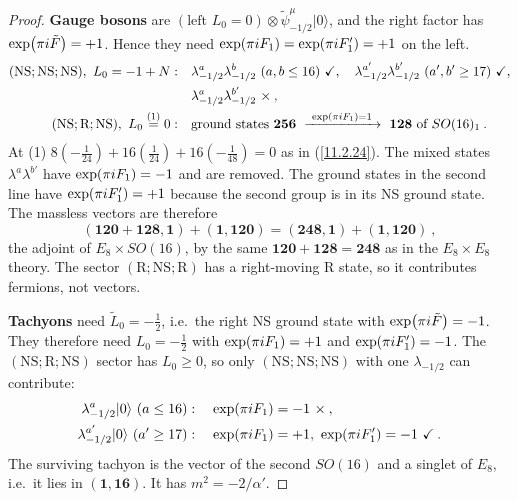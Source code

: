 \begin{tcolorbox}[breakable]
\begin{proof}
		\textbf{Gauge bosons} are $(\text{left }L_{0}=0)\otimes\tilde{\psi}^{\mu}_{-1/2}\lvert0\rangle$, and the right factor has $\exp(\pi i\tilde{F})=+1$. Hence they need $\exp(\pi i F_{1})=\exp(\pi i F_{1}')=+1$ on the left.
		\begin{align*}
			(\text{NS};\text{NS};\text{NS}),\ L_{0}=-1+N:&\quad \lambda^{a}_{-1/2}\lambda^{b}_{-1/2}\ (a,b\leq16)\ \checkmark,\quad
			\lambda^{a'}_{-1/2}\lambda^{b'}_{-1/2}\ (a',b'\geq17)\ \checkmark,\\
			&\quad \lambda^{a}_{-1/2}\lambda^{b'}_{-1/2}\ \times\:,\\
			(\text{NS};\text{R};\text{NS}),\ L_{0}\eqs{1}0:&\quad \text{ground states }\mathbf{256}\ \xrightarrow{\ \exp(\pi\mi F_{1})=1\ }\ \mathbf{128}\ \text{of }SO(16)_{1}\:.
		\end{align*}
		At (1) $8(-\frac{1}{24})+16(\frac{1}{24})+16(-\frac{1}{48})=0$ as in (\ref{11.2.24}). The mixed states $\lambda^{a}\lambda^{b'}$ have $\exp(\pi i F_{1})=-1$ and are removed. The ground states in the second line have $\exp(\pi i F_{1}')=+1$ because the second group is in its NS ground state. The massless vectors are therefore
		\begin{equation*}
			(\mathbf{120}+\mathbf{128},\mathbf{1})+(\mathbf{1},\mathbf{120})=(\mathbf{248},\mathbf{1})+(\mathbf{1},\mathbf{120})\:,
		\end{equation*}
		the adjoint of $E_{8}\times SO(16)$, by the same $\mathbf{120}+\mathbf{128}=\mathbf{248}$ as in the $E_{8}\times E_{8}$ theory. The sector $(\text{R};\text{NS};\text{R})$ has a right-moving R state, so it contributes fermions, not vectors.

		\textbf{Tachyons} need $\tilde{L}_{0}=-\frac{1}{2}$, i.e.\ the right NS ground state with $\exp(\pi i\tilde{F})=-1$. They therefore need $L_{0}=-\frac{1}{2}$ with $\exp(\pi i F_{1})=+1$ and $\exp(\pi i F_{1}')=-1$. The $(\text{NS};\text{R};\text{NS})$ sector has $L_{0}\geq0$, so only $(\text{NS};\text{NS};\text{NS})$ with one $\lambda_{-1/2}$ can contribute:
		\begin{align*}
			\lambda^{a}_{-1/2}\lvert0\rangle\ (a\leq16)&:\quad \exp(\pi i F_{1})=-1\ \times\:,\\
			\lambda^{a'}_{-1/2}\lvert0\rangle\ (a'\geq17)&:\quad \exp(\pi i F_{1})=+1,\ \exp(\pi i F_{1}')=-1\ \checkmark\:.
		\end{align*}
		The surviving tachyon is the vector of the second $SO(16)$ and a singlet of $E_{8}$, i.e.\ it lies in $(\mathbf{1},\mathbf{16})$. It has $m^{2}=-2/\alpha'$.
	\end{proof}
\end{tcolorbox}

